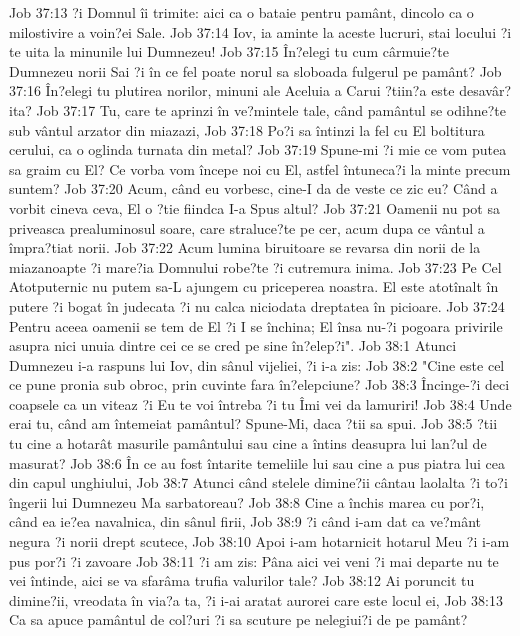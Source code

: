 Job 37:13  ?i Domnul îi trimite: aici ca o bataie pentru pamânt, dincolo ca o milostivire a voin?ei Sale.
Job 37:14  Iov, ia aminte la aceste lucruri, stai locului ?i te uita la minunile lui Dumnezeu!
Job 37:15  În?elegi tu cum cârmuie?te Dumnezeu norii Sai ?i în ce fel poate norul sa sloboada fulgerul pe pamânt?
Job 37:16  În?elegi tu plutirea norilor, minuni ale Aceluia a Carui ?tiin?a este desavâr?ita?
Job 37:17  Tu, care te aprinzi în ve?mintele tale, când pamântul se odihne?te sub vântul arzator din miazazi,
Job 37:18  Po?i sa întinzi la fel cu El boltitura cerului, ca o oglinda turnata din metal?
Job 37:19  Spune-mi ?i mie ce vom putea sa graim cu El? Ce vorba vom începe noi cu El, astfel întuneca?i la minte precum suntem?
Job 37:20  Acum, când eu vorbesc, cine-I da de veste ce zic eu? Când a vorbit cineva ceva, El o ?tie fiindca I-a Spus altul?
Job 37:21  Oamenii nu pot sa priveasca prealuminosul soare, care straluce?te pe cer, acum dupa ce vântul a împra?tiat norii.
Job 37:22  Acum lumina biruitoare se revarsa din norii de la miazanoapte ?i mare?ia Domnului robe?te ?i cutremura inima.
Job 37:23  Pe Cel Atotputernic nu putem sa-L ajungem cu priceperea noastra. El este atotînalt în putere ?i bogat în judecata ?i nu calca niciodata dreptatea în picioare.
Job 37:24  Pentru aceea oamenii se tem de El ?i I se închina; El însa nu-?i pogoara privirile asupra nici unuia dintre cei ce se cred pe sine în?elep?i".
Job 38:1  Atunci Dumnezeu i-a raspuns lui Iov, din sânul vijeliei, ?i i-a zis:
Job 38:2  "Cine este cel ce pune pronia sub obroc, prin cuvinte fara în?elepciune?
Job 38:3  Încinge-?i deci coapsele ca un viteaz ?i Eu te voi întreba ?i tu Îmi vei da lamuriri!
Job 38:4  Unde erai tu, când am întemeiat pamântul? Spune-Mi, daca ?tii sa spui.
Job 38:5  ?tii tu cine a hotarât masurile pamântului sau cine a întins deasupra lui lan?ul de masurat?
Job 38:6  În ce au fost întarite temeliile lui sau cine a pus piatra lui cea din capul unghiului,
Job 38:7  Atunci când stelele dimine?ii cântau laolalta ?i to?i îngerii lui Dumnezeu Ma sarbatoreau?
Job 38:8  Cine a închis marea cu por?i, când ea ie?ea navalnica, din sânul firii,
Job 38:9  ?i când i-am dat ca ve?mânt negura ?i norii drept scutece,
Job 38:10  Apoi i-am hotarnicit hotarul Meu ?i i-am pus por?i ?i zavoare
Job 38:11  ?i am zis: Pâna aici vei veni ?i mai departe nu te vei întinde, aici se va sfarâma trufia valurilor tale?
Job 38:12  Ai poruncit tu dimine?ii, vreodata în via?a ta, ?i i-ai aratat aurorei care este locul ei,
Job 38:13  Ca sa apuce pamântul de col?uri ?i sa scuture pe nelegiui?i de pe pamânt?

